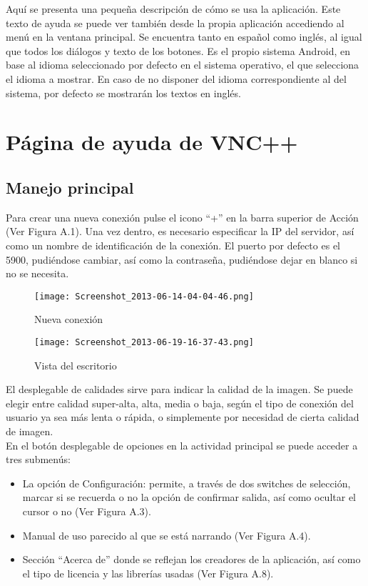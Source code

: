 Aquí se presenta una pequeña descripción de cómo se usa la aplicación. Este texto de ayuda se puede ver también desde la propia aplicación accediendo al menú en la ventana principal. Se encuentra tanto en español como inglés, al igual que todos los diálogos y texto de los botones. Es el propio sistema Android, en base al idioma seleccionado por defecto en el sistema operativo, el que selecciona el idioma a mostrar. En caso de no disponer del idioma correspondiente al del sistema, por defecto se mostrarán los textos en inglés.
\section{Página de ayuda de VNC++}
\subsection{Manejo principal}
Para crear una nueva conexión pulse el icono ``+'' en la barra superior de Acción (Ver Figura A.1). Una vez dentro, es necesario especificar la IP del servidor, así como un nombre de identificación de la conexión. El puerto por defecto es el 5900, pudiéndose cambiar, así como la contraseña, pudiéndose dejar en blanco si no se necesita.
\begin{figure}[h]
\hfill
\begin{minipage}[t]{.45\textwidth}
\begin{center}
\texttt{[image: Screenshot\_2013-06-14-04-04-46.png]}
\caption{Nueva conexión}
\end{center}
\end{minipage}
\hfill
\begin{minipage}[t]{.45\textwidth}
\begin{center}
\texttt{[image: Screenshot\_2013-06-19-16-37-43.png]}
\caption{Vista del escritorio}
\end{center}
\end{minipage}
\hfill
\end{figure}
\newpage

El desplegable de calidades sirve para indicar la calidad de la imagen. Se puede elegir entre calidad super-alta, alta, media o baja, según el tipo de conexión del usuario ya sea más lenta o rápida, o simplemente por necesidad de cierta calidad de imagen.\\

En el botón desplegable de opciones en la actividad principal se puede acceder a tres submenús:
\begin{itemize}
\item La opción de Configuración: permite, a través de dos switches de selección, marcar si se recuerda o no la opción de confirmar salida, así como ocultar el cursor o no (Ver Figura A.3).
\item Manual de uso parecido al que se está narrando (Ver Figura A.4).
\item Sección ``Acerca de'' donde se reflejan los creadores de la aplicación, así como el tipo de licencia y las librerías usadas (Ver Figura A.8).
\end{itemize}

